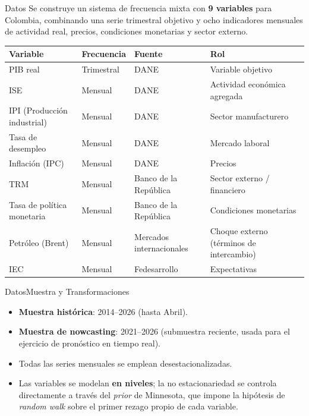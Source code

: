 \documentclass{beamer}
\begin{document}
\begin{frame}{Datos}{}\justifying
Se construye un sistema de frecuencia mixta con \textbf{9 variables} para Colombia, combinando una serie trimestral objetivo y ocho indicadores mensuales de actividad real, precios, condiciones monetarias y sector externo. \pause

\begin{table}[h]
\centering
\tiny
\begin{tabular}{llll}
\toprule
\textbf{Variable} & \textbf{Frecuencia} & \textbf{Fuente} & \textbf{Rol} \\
\midrule
PIB real & Trimestral & DANE & Variable objetivo \\
ISE & Mensual & DANE & Actividad económica agregada \\
IPI (Producción industrial) & Mensual & DANE & Sector manufacturero \\
Tasa de desempleo & Mensual & DANE & Mercado laboral \\
Inflación (IPC) & Mensual & DANE & Precios \\
TRM & Mensual & Banco de la República & Sector externo / financiero \\
Tasa de política monetaria & Mensual & Banco de la República & Condiciones monetarias \\
Petróleo (Brent) & Mensual & Mercados internacionales & Choque externo (términos de intercambio) \\
IEC & Mensual & Fedesarrollo & Expectativas \\
\bottomrule
\end{tabular}
\end{table}
\end{frame}

\begin{frame}{Datos}{Muestra y Transformaciones}\justifying
\begin{itemize}\justifying
    \item \textbf{Muestra histórica}: 2014--2026 (hasta Abril).
    \item \textbf{Muestra de nowcasting}: 2021--2026 (submuestra reciente, usada para el ejercicio de pronóstico en tiempo real).
    \item Todas las series mensuales se emplean desestacionalizadas.
    \item Las variables se modelan \textbf{en niveles}; la no estacionariedad se controla directamente a través del \textit{prior} de Minnesota, que impone la hipótesis de \textit{random walk} sobre el primer rezago propio de cada variable.
\end{itemize}
\end{frame}
\end{document}
